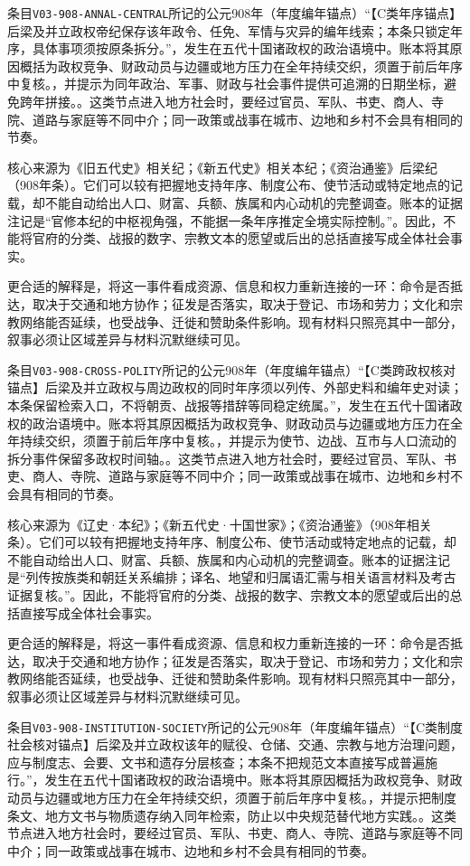 条目\texttt{V03-908-ANNAL-CENTRAL}所记的公元908年（年度编年锚点）“【C类年序锚点】后梁及并立政权帝纪保存该年政令、任免、军情与灾异的编年线索；本条只锁定年序，具体事项须按原条拆分。”，发生在五代十国诸政权的政治语境中。账本将其原因概括为政权竞争、财政动员与边疆或地方压力在全年持续交织，须置于前后年序中复核。，并提示为同年政治、军事、财政与社会事件提供可追溯的日期坐标，避免跨年拼接。。这类节点进入地方社会时，要经过官员、军队、书吏、商人、寺院、道路与家庭等不同中介；同一政策或战事在城市、边地和乡村不会具有相同的节奏。

核心来源为《旧五代史》相关纪；《新五代史》相关本纪；《资治通鉴》后梁纪（908年条）。它们可以较有把握地支持年序、制度公布、使节活动或特定地点的记载，却不能自动给出人口、财富、兵额、族属和内心动机的完整调查。账本的证据注记是“官修本纪的中枢视角强，不能据一条年序推定全境实际控制。”。因此，不能将官府的分类、战报的数字、宗教文本的愿望或后出的总括直接写成全体社会事实。

更合适的解释是，将这一事件看成资源、信息和权力重新连接的一环：命令是否抵达，取决于交通和地方协作；征发是否落实，取决于登记、市场和劳力；文化和宗教网络能否延续，也受战争、迁徙和赞助条件影响。现有材料只照亮其中一部分，叙事必须让区域差异与材料沉默继续可见。

条目\texttt{V03-908-CROSS-POLITY}所记的公元908年（年度编年锚点）“【C类跨政权核对锚点】后梁及并立政权与周边政权的同时年序须以列传、外部史料和编年史对读；本条保留检索入口，不将朝贡、战报等措辞等同稳定统属。”，发生在五代十国诸政权的政治语境中。账本将其原因概括为政权竞争、财政动员与边疆或地方压力在全年持续交织，须置于前后年序中复核。，并提示为使节、边战、互市与人口流动的拆分事件保留多政权时间轴。。这类节点进入地方社会时，要经过官员、军队、书吏、商人、寺院、道路与家庭等不同中介；同一政策或战事在城市、边地和乡村不会具有相同的节奏。

核心来源为《辽史·本纪》；《新五代史·十国世家》；《资治通鉴》（908年相关条）。它们可以较有把握地支持年序、制度公布、使节活动或特定地点的记载，却不能自动给出人口、财富、兵额、族属和内心动机的完整调查。账本的证据注记是“列传按族类和朝廷关系编排；译名、地望和归属语汇需与相关语言材料及考古证据复核。”。因此，不能将官府的分类、战报的数字、宗教文本的愿望或后出的总括直接写成全体社会事实。

更合适的解释是，将这一事件看成资源、信息和权力重新连接的一环：命令是否抵达，取决于交通和地方协作；征发是否落实，取决于登记、市场和劳力；文化和宗教网络能否延续，也受战争、迁徙和赞助条件影响。现有材料只照亮其中一部分，叙事必须让区域差异与材料沉默继续可见。

条目\texttt{V03-908-INSTITUTION-SOCIETY}所记的公元908年（年度编年锚点）“【C类制度社会核对锚点】后梁及并立政权该年的赋役、仓储、交通、宗教与地方治理问题，应与制度志、会要、文书和遗存分层核查；本条不把规范文本直接写成普遍施行。”，发生在五代十国诸政权的政治语境中。账本将其原因概括为政权竞争、财政动员与边疆或地方压力在全年持续交织，须置于前后年序中复核。，并提示把制度条文、地方文书与物质遗存纳入同年检索，防止以中央规范替代地方实践。。这类节点进入地方社会时，要经过官员、军队、书吏、商人、寺院、道路与家庭等不同中介；同一政策或战事在城市、边地和乡村不会具有相同的节奏。

